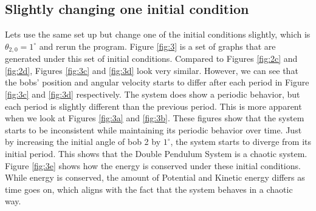 \subsection{Slightly changing one initial condition}
Lets use the same set up but change one of the initial conditions slightly, which is $\theta_{2,0} = 1^\circ$ and rerun the program. Figure \ref{fig:3} is a set of graphs that are generated under this set of initial conditions. Compared to Figures \ref{fig:2c} and \ref{fig:2d}, Figures \ref{fig:3c} and \ref{fig:3d} look very similar. However, we can see that the bobs' position and angular velocity starts to differ after each period in Figure \ref{fig:3c} and \ref{fig:3d} respectively. The system does show a periodic behavior, but each period is slightly different than the previous period. This is more apparent when we look at Figures \ref{fig:3a} and \ref{fig:3b}. These figures show that the system starts to be inconsistent while maintaining its periodic behavior over time. Just by increasing the initial angle of bob 2 by $1^\circ$, the system starts to diverge from its initial period. This shows that the Double Pendulum System is a chaotic system. Figure \ref{fig:3e} shows how the energy is conserved under these initial conditions. While energy is conserved, the amount of Potential and Kinetic energy differs as time goes on, which aligns with the fact that the system behaves in a chaotic way.
